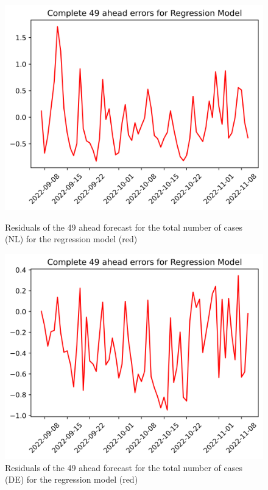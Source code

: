 \begin{figure}

\begin{minipage}{.45\textwidth}
  \centering
  \includegraphics[width=\linewidth]{pics/49_ah/49_ahead_errors_Regression Model.png}
  \caption{Residuals of the 49 ahead forecast for the total number of cases (NL) for the regression model (red)}
  \label{fig:tot_cases_error_49_RM}
\end{minipage}
\begin{minipage}{.45\textwidth}
  \centering
  \includegraphics[width=\linewidth]{pics/49_ah/DE_49_ahead_errors_Regression Model.png}
  \caption{Residuals of the 49 ahead forecast for the total number of cases (DE) for the regression model (red)}
  \label{fig:tot_cases_error_49_RM_DE}
\end{minipage}

\end{figure}
